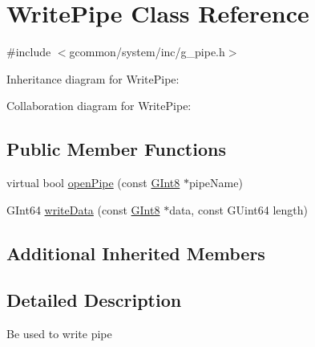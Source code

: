 \hypertarget{class_write_pipe}{\section{Write\-Pipe Class Reference}
\label{class_write_pipe}
}


{\ttfamily \#include $<$gcommon/system/inc/g\-\_\-pipe.\-h$>$}



Inheritance diagram for Write\-Pipe\-:


Collaboration diagram for Write\-Pipe\-:
\subsection*{Public Member Functions}
\begin{DoxyCompactItemize}
\item 
virtual bool \hyperlink{class_write_pipe_a017e340c73031692d55b299e16da3e0b}{open\-Pipe} (const \hyperlink{g__type_8h_ad1732c0e4cf5d108f232e44a1179e8b0}{G\-Int8} $\ast$pipe\-Name)
\item 
G\-Int64 \hyperlink{class_write_pipe_a421988218fe8d1a605de3dc53920a51f}{write\-Data} (const \hyperlink{g__type_8h_ad1732c0e4cf5d108f232e44a1179e8b0}{G\-Int8} $\ast$data, const G\-Uint64 length)
\end{DoxyCompactItemize}
\subsection*{Additional Inherited Members}


\subsection{Detailed Description}
Be used to write pipe 

